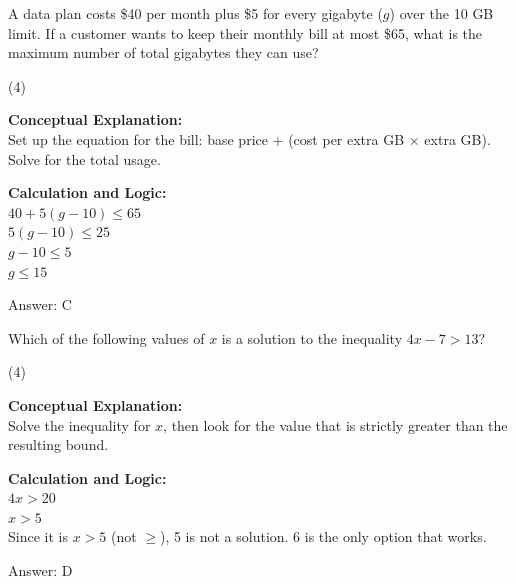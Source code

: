 \documentclass[11pt,paper=a4,answers]{exam}
\begin{document}
\begin{questions}
\question
A data plan costs \$40 per month plus \$5 for every gigabyte ($g$) over the 10 GB limit. If a customer wants to keep their monthly bill at most \$65, what is the maximum number of total gigabytes they can use?
\begin{tasks}(4)
\end{tasks}

\begin{solution}
\textbf{Conceptual Explanation:} \\
Set up the equation for the bill: base price + (cost per extra GB $\times$ extra GB). Solve for the total usage.

\vspace{10pt}
\textbf{Calculation and Logic:} \\
$40 + 5(g - 10) \le 65$ \\
$5(g - 10) \le 25$ \\
$g - 10 \le 5$ \\
$g \le 15$

\vspace{15pt}
Answer: \colorbox{yellow!100}{C}
\end{solution}

\vspace{20pt}

\question
Which of the following values of $x$ is a solution to the inequality $4x - 7 > 13$?
\begin{tasks}(4)
\end{tasks}

\begin{solution}
\textbf{Conceptual Explanation:} \\
Solve the inequality for $x$, then look for the value that is strictly greater than the resulting bound.

\vspace{10pt}
\textbf{Calculation and Logic:} \\
$4x > 20$ \\
$x > 5$ \\
Since it is $x > 5$ (not $\ge$), 5 is not a solution. 6 is the only option that works.

\vspace{15pt}
Answer: \colorbox{yellow!100}{D}
\end{solution}


\end{questions}
\end{document}

